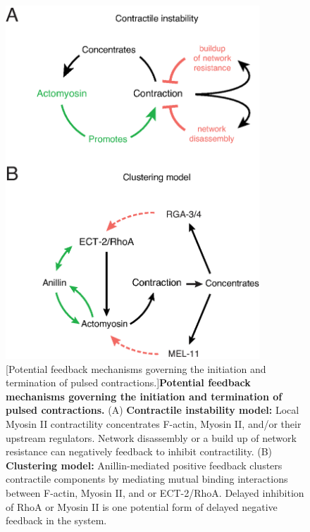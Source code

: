 \documentclass{ucetd}
\begin{document}
\begin{figure}[!htbp]
\centering
\includegraphics[width=0.85\textwidth]{Figure1-4}
[Potential feedback mechanisms governing the initiation and termination of pulsed contractions.]{\textbf{Potential feedback mechanisms governing the initiation and termination of pulsed contractions.} (A) \textbf{Contractile instability model:} Local Myosin II contractility concentrates F-actin, Myosin II, and/or their upstream regulators.  Network disassembly or a build up of network resistance can negatively feedback to inhibit contractility. (B) \textbf{Clustering model:} Anillin-mediated positive feedback clusters contractile components by mediating mutual binding interactions between F-actin, Myosin II, and or ECT-2/RhoA.  Delayed inhibition of RhoA or Myosin II is one potential form of delayed negative feedback in the system.}
\end{figure}
\end{document}
